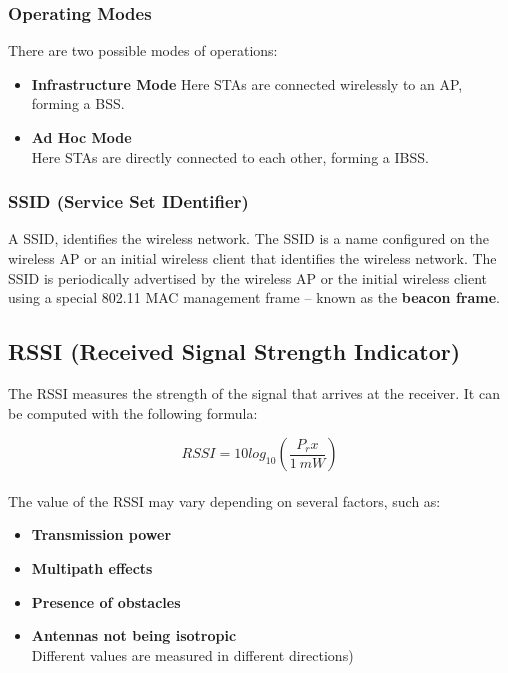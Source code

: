 \documentclass{article}
\begin{document}
\subsubsection{Operating Modes}
There are two possible modes of operations:

\begin{itemize}
	\item \textbf{Infrastructure Mode}
	\vspace{.2cm}
	Here STAs are connected wirelessly to an AP, forming a BSS.
	
	\item \textbf{Ad Hoc Mode}
	\vspace{.2cm} \\
	Here STAs are directly connected to each other, forming a IBSS.
\end{itemize}

\subsubsection{SSID (Service Set IDentifier)}
A SSID, identifies the wireless network. The SSID is a name configured on the wireless AP or an initial wireless client that identifies the wireless network. The SSID is periodically advertised by the wireless AP or the initial wireless client using a special 802.11 MAC management frame -- known as the \textbf{beacon frame}.

\subsection{RSSI (Received Signal Strength Indicator)}
The RSSI measures the strength of the signal that arrives at the receiver. It can be computed with the following formula:

\[ RSSI = 10 log_{10}(\frac{P_rx}{1~mW}) \] \\
The value of the RSSI may vary depending on several factors, such as:

\begin{itemize}
	\item \textbf{Transmission power}
	\item \textbf{Multipath effects}
	\item \textbf{Presence of obstacles}
	\item \textbf{Antennas not being isotropic}
	\vspace{.2cm} \\	
	Different values are measured in different directions)
\end{itemize}
\end{document}
